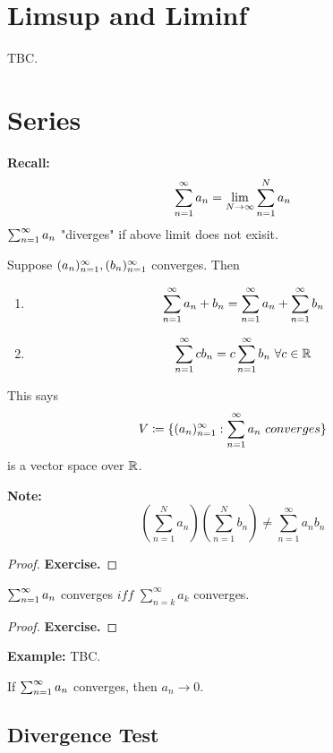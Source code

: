 \documentclass[openany]{report}
\begin{document}
\chapter{Limsup and Liminf}
TBC.

\chapter{Series}
\textbf{Recall:}
\[\sum_{n=1}^\infty a_n = \lim_{N\rightarrow \infty} \sum_{n=1}^N a_n\]
$\sum_{n=1}^\infty a_n$ "diverges" if above limit does not exisit.
\begin{prop}
    Suppose $({a}_n)_{n=1}^\infty, ({b}_n)_{n=1}^\infty$ converges. Then
    \begin{enumerate}[label=(\roman*)]
        \item 
        \[\sum_{n=1}^\infty a_n + b_n = \sum_{n=1}^\infty a_n + \sum_{n=1}^\infty b_n\]
        \item
        \[\sum_{n=1}^\infty cb_n = c\sum_{n=1}^\infty b_n \ \forall c \in \mathbb{R}\]
    \end{enumerate}
    This says 
    \[V \coloneqq \{({a}_n)_{n=1}^\infty: \sum_{n=1}^\infty a_n \ converges\}\]
    is a vector space over $\mathbb{R}$.
\end{prop}

\begin{center}
    \textbf{Note:}
    \[\left(\sum_{n=1}^N a_n\right) \left(\sum_{n=1}^N b_n\right) \neq \sum_{n=1}^\infty a_nb_n\]
\end{center}

\begin{proof}
    \textbf{Exercise.}
\end{proof}

\begin{prop}
    \begin{center}
        $\sum_{n=1}^\infty a_n$ converges $iff$ $\sum_{n=k}^\infty a_k$ converges.
    \end{center}
\end{prop}
\begin{proof}
    \textbf{Exercise.}
\end{proof}

\textbf{Example:} TBC.

\begin{prop}
    If $\sum_{n=1}^\infty a_n$ converges, then $a_n \rightarrow 0$.
\end{prop}


\section{Divergence Test}
\end{document}
